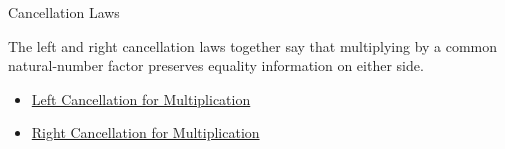 \begin{topicbox}{Cancellation Laws}
\begin{remark*}[Interpretation]
The left and right cancellation laws together say that multiplying by a common
natural-number factor preserves equality information on either side.
\end{remark*}

\begin{dependencies}
\begin{itemize}
  \item \hyperref[thm:multiplication-left-cancellation]{Left Cancellation for Multiplication}
  \item \hyperref[thm:multiplication-right-cancellation]{Right Cancellation for Multiplication}
\end{itemize}
\end{dependencies}
\end{topicbox}
